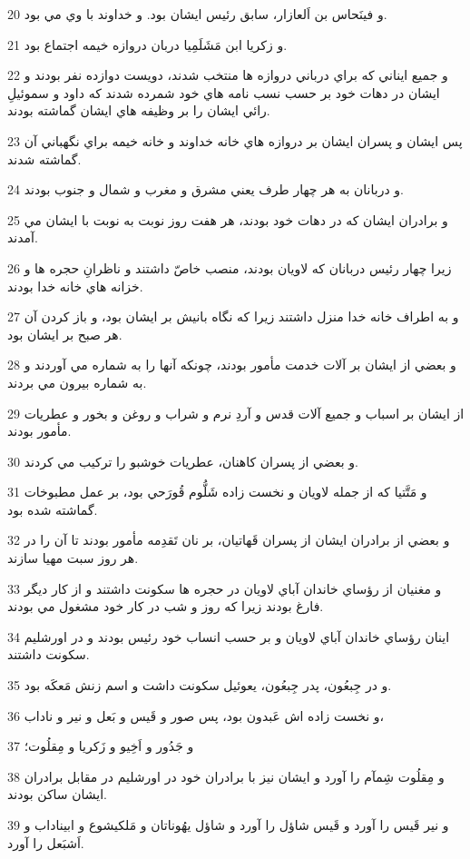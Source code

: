\par 20 و فينَحاس بن اَلعازار، سابق رئيس ايشان بود. و خداوند با وي مي بود.
\par 21 و زکريا ابن مَشَلَمِيا دربان دروازه خيمه اجتماع بود.
\par 22 و جميع ايناني که براي درباني دروازه ها منتخب شدند، دويست دوازده نفر بودند و ايشان در دهات خود بر حسب نسب نامه هاي خود شمرده شدند که داود و سموئيلِ رائي ايشان را بر وظيفه هاي ايشان گماشته بودند.
\par 23 پس ايشان و پسران ايشان بر دروازه هاي خانه خداوند و خانه خيمه براي نگهباني آن گماشته شدند.
\par 24 و دربانان به هر چهار طرف يعني مشرق و مغرب و شمال و جنوب بودند.
\par 25 و برادران ايشان که در دهات خود بودند، هر هفت روز نوبت به نوبت با ايشان مي آمدند.
\par 26 زيرا چهار رئيس دربانان که لاويان بودند، منصب خاصّ داشتند و ناظرانِ حجره ها و خزانه هاي خانه خدا بودند.
\par 27 و به اطراف خانه خدا منزل داشتند زيرا که نگاه بانيش بر ايشان بود، و باز کردن آن هر صبح بر ايشان بود.
\par 28 و بعضي از ايشان بر آلات خدمت مأمور بودند، چونکه آنها را به شماره مي آوردند و به شماره بيرون مي بردند.
\par 29 از ايشان بر اسباب و جميع آلات قدس و آردِ نرم و شراب و روغن و بخور و عطريات مأمور بودند.
\par 30 و بعضي از پسران کاهنان، عطريات خوشبو را ترکيب مي کردند.
\par 31 و مَتَّتيا که از جمله لاويان و نخست زاده شَلُّوم قُورَحي بود، بر عمل مطبوخات گماشته شده بود.
\par 32 و بعضي از برادران ايشان از پسران قَهاتيان، بر نان تَقدِمه مأمور بودند تا آن را در هر روز سبت مهيا سازند.
\par 33 و مغنيان از رؤساي خاندان آباي لاويان در حجره ها سکونت داشتند و از کار ديگر فارغ بودند زيرا که روز و شب در کار خود مشغول مي بودند.
\par 34 اينان رؤساي خاندان آباي لاويان و بر حسب انساب خود رئيس بودند و در اورشليم سکونت داشتند.
\par 35 و در جِبعُون، پدر جِبعُون، يعوئيل سکونت داشت و اسم زنش مَعکَه بود.
\par 36 و نخست زاده اش عَبدون بود، پس صور و قَيس و بَعل و نير و ناداب،
\par 37 و جَدُور و اَخِيو و زَکريا و مِقلُوت؛
\par 38 و مِقلُوت شِمآم را آورد و ايشان نيز با برادران خود در اورشليم در مقابل برادران ايشان ساکن بودند.
\par 39 و نير قَيس را آورد و قَيس شاؤل را آورد و شاؤل يهُوناتان و مَلکيشوع و ابيناداب و اَشبَعل را آورد.
